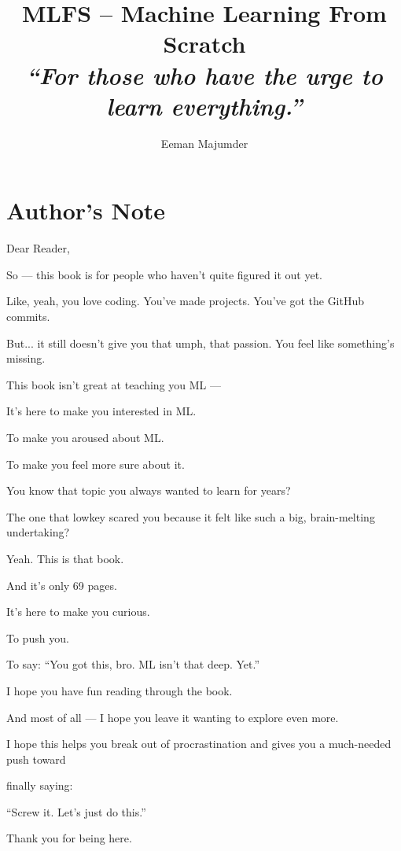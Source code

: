 \documentclass[11pt, letterpaper, openany]{book}
\begin{document}
\title{
    \Huge\bfseries MLFS – Machine Learning From Scratch \\
    \large\normalfont\textit{“For those who have the urge to learn everything.”}
}
\author{Eeman Majumder}
\date{}
\maketitle




\clearpage
\chapter*{Author’s Note}

Dear Reader,

So — this book is for people who haven’t quite figured it out yet.

Like, yeah, you love coding. You’ve made projects. You’ve got the GitHub commits.

But... it still doesn’t give you that umph, that passion. You feel like something’s missing.

This book isn’t great at teaching you ML —

It’s here to make you interested in ML.

To make you aroused about ML.

To make you feel more sure about it.

You know that topic you always wanted to learn for years?

The one that lowkey scared you because it felt like such a big, brain-melting undertaking?

Yeah. This is that book.

And it’s only 69 pages.

It’s here to make you curious.

To push you.

To say: “You got this, bro. ML isn’t that deep. Yet.”

I hope you have fun reading through the book.

And most of all — I hope you leave it wanting to explore even more.

I hope this helps you break out of procrastination and gives you a much-needed push toward 

finally saying:

“Screw it. Let’s just do this.”

Thank you for being here.
\end{document}
